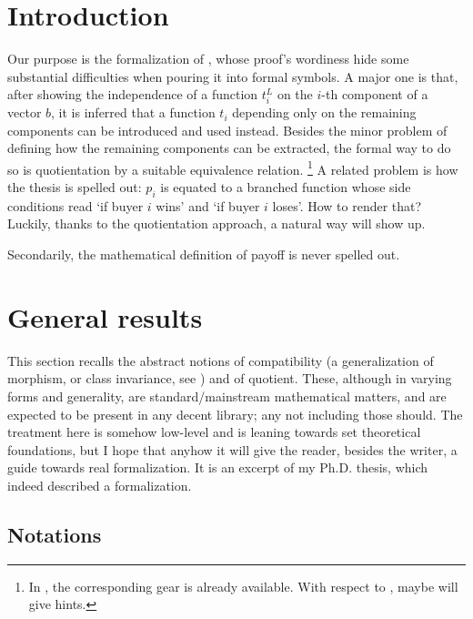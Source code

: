 \documentclass[oneside
]
{article}
\theoremstyle{plain}
\theoremstyle{definition}
\begin{document}
\section{Introduction}

Our purpose is the formalization of \cite[Proposition~2]{mas-04}, whose proof's wordiness hide some substantial difficulties when pouring it into formal symbols.
A major one is that, after showing the independence of a function $t_i^L$ on the $i$-th component of a vector $b$, it is inferred that a function $ t_i $ depending only on the remaining components can be introduced and used instead.
Besides the minor problem of defining how the remaining components can be extracted, the formal way to do so is quotientation by a suitable equivalence relation.%
\footnote{In \M{}, the corresponding gear is already available. 
With respect to \I{}, maybe \cite{slotosch1997higher} will give hints.
}%
A related problem is how the thesis is spelled out: $p_i$ is equated to a branched function whose side conditions read `if buyer $i$ wins' and `if buyer $i$ loses'.
How to render that? Luckily, thanks to the quotientation approach, a natural way will show up. 

Secondarily, the mathematical definition of payoff is never spelled out.
\section{General results}

This section recalls the abstract notions of compatibility (a generalization of morphism, or class invariance, see \WwwKernel{}) and of quotient. 
These, although in varying forms and generality, are standard/mainstream mathematical matters, and are expected to be present in any decent library; any not including those should.
The treatment here is somehow low-level and is leaning towards set theoretical foundations, but I hope that anyhow it will give the reader, besides the writer, a guide towards real formalization.
It is an excerpt of my Ph.D. thesis, which indeed described a \M{} formalization.

\subsection{Notations}
\end{document}
